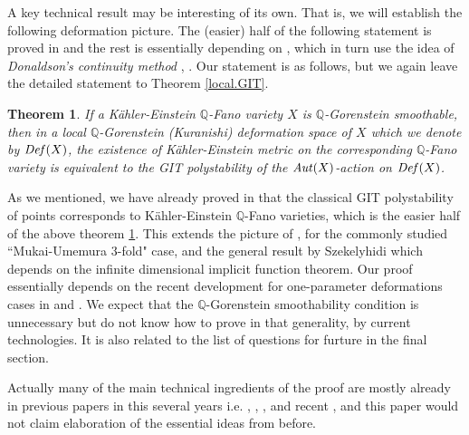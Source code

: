 \documentclass[12pt]{amsart}
\newtheorem{Thm}{Theorem}[section]
\theoremstyle{remark}
\theoremstyle{definition}
\begin{document}
A key technical result 
may be interesting of its own. That is, 
we will establish the following deformation 
picture. The (easier) half of the following statement is proved in 
\cite{OSS} and 
the rest is essentially depending on \cite{LWX}, \cite{SSY} 
which in turn 
use the idea of \emph{Donaldson's continuity method} \cite{CDS}, \cite{Tia2}. 
Our statement is as follows, but we again leave the 
detailed statement to Theorem \ref{local.GIT}. 

\begin{Thm}\label{local.GIT.rough}
If a K\"ahler-Einstein $\mathbb{Q}$-Fano variety $X$ is 
$\mathbb{Q}$-Gorenstein smoothable, 
then in a local $\mathbb{Q}$-Gorenstein (Kuranishi) deformation space of $X$ 
which we denote by ${\it Def}(X)$, the 
existence of K\"ahler-Einstein metric on the corresponding $\mathbb{Q}$-Fano variety is equivalent 
to the GIT polystability of the ${\it Aut}(X)$-action on ${\it Def}(X)$. 
\end{Thm}

As we mentioned, we have already proved in \cite[Lemma 3.6]{OSS} 
that the classical GIT polystability 
of points corresponds to K\"ahler-Einstein $\mathbb{Q}$-Fano varieties, 
which is the easier half of the above theorem \ref{local.GIT.rough}. 
This extends the picture of \cite{Tia}, \cite{Don1} for the commonly studied 
``Mukai-Umemura $3$-fold" case, and
the general result by Szekelyhidi \cite{Sze} which depends 
on the infinite dimensional implicit function theorem. Our proof 
essentially depends on the recent development for one-parameter deformations cases 
in \cite{LWX} and \cite{SSY}. 
We expect that the $\mathbb{Q}$-Gorenstein smoothability condition 
is unnecessary but do not know how to prove in 
that generality, by current technologies. 
It is also related to the list of questions for 
furture in the final section. 

Actually many of the main technical ingredients of the proof are mostly already in 
previous papers 
in this several years 
i.e. \cite{DS}, \cite{Spo}, \cite{Od2}, 
\cite{OSS} and recent \cite{SSY}, \cite{LWX} 
and this paper would not claim elaboration of the essential ideas from before. 
\end{document}
